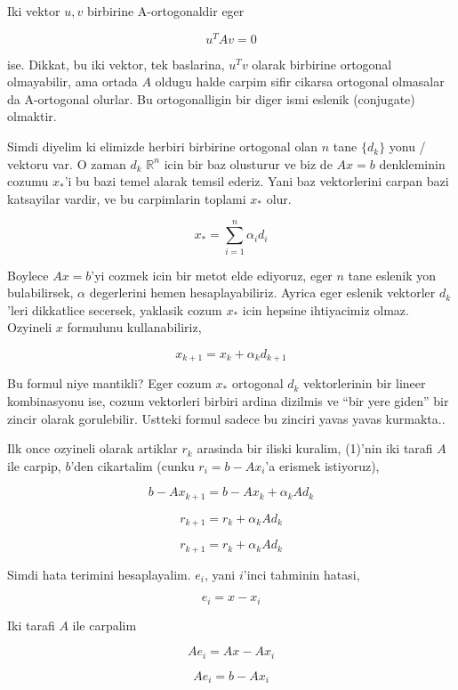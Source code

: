 \documentclass[12pt,fleqn]{article}\usepackage{../common}
\begin{document}
Iki vektor $u,v$ birbirine A-ortogonaldir eger

\[ u^TAv = 0 \] 

ise. Dikkat, bu iki vektor, tek baslarina, $u^Tv$ olarak birbirine
ortogonal olmayabilir, ama ortada $A$ oldugu halde carpim sifir cikarsa
ortogonal olmasalar da A-ortogonal olurlar. Bu ortogonalligin bir diger
ismi eslenik (conjugate) olmaktir.

Simdi diyelim ki elimizde herbiri birbirine ortogonal olan $n$ tane
$\{d_k\}$ yonu / vektoru var. O zaman $d_k$ $\mathbb{R}^n$ icin bir baz
olusturur ve biz de $Ax = b$ denkleminin cozumu $x_*$'i bu bazi temel
alarak temsil ederiz. Yani baz vektorlerini carpan bazi katsayilar vardir,
ve bu carpimlarin toplami $x_*$ olur. 

\[ x_* = \sum _{ i=1}^{n} \alpha_i d_i \]

Boylece $Ax = b$'yi cozmek icin bir metot elde ediyoruz, eger $n$ tane
eslenik yon bulabilirsek, $\alpha$ degerlerini hemen hesaplayabiliriz.
Ayrica eger eslenik vektorler $d_k$'leri dikkatlice secersek, yaklasik cozum $x_*$
icin hepsine ihtiyacimiz olmaz. Ozyineli $x$ formulunu kullanabiliriz,

\begin{equation}\label{(1)}
x_{k+1} = x_k + \alpha_k d_{k+1}
\end{equation}

Bu formul niye mantikli? Eger cozum $x_*$ ortogonal $d_k$ vektorlerinin bir
lineer kombinasyonu ise, cozum vektorleri birbiri ardina dizilmis ve ``bir
yere giden'' bir zincir olarak gorulebilir. Ustteki formul sadece bu
zinciri yavas yavas kurmakta..

Ilk once ozyineli olarak artiklar $r_k$ arasinda bir iliski kuralim,
(1)'nin iki tarafi $A$ ile carpip, $b$'den cikartalim (cunku
$r_i = b -
Ax_i$'a erismek istiyoruz),

\[b - A x_{k+1} = b - A x_k  + \alpha_k A d_{k} \]

\[r_{k+1} = r_k + \alpha_k A d_{k} \]

\begin{equation}\label{8}
r_{k+1} = r_k + \alpha_k A d_{k} 
\end{equation}

Simdi hata terimini hesaplayalim. $e_i$, yani $i$'inci tahminin hatasi, 

\[ e_i = x - x_i  \]

Iki tarafi $A$ ile carpalim

\[ Ae_i = Ax - Ax_i  \]

\[ Ae_i = b - Ax_i  \]
\end{document}
